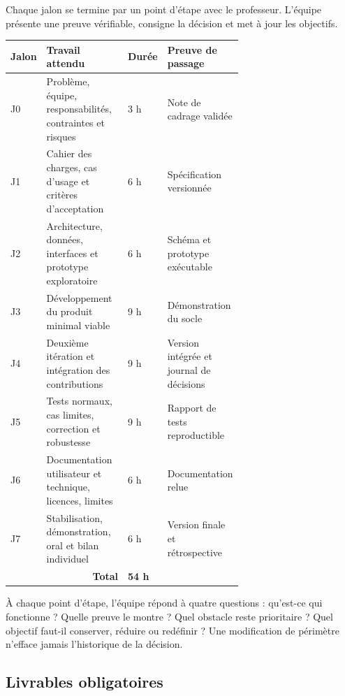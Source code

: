 Chaque jalon se termine par un point d'étape avec le professeur. L'équipe présente une
preuve vérifiable, consigne la décision et met à jour les objectifs.

\begin{center}
\begin{tabular}{|p{0.08\linewidth}|>{\raggedright\arraybackslash}p{0.46\linewidth}|p{0.12\linewidth}|>{\raggedright\arraybackslash}p{\dimexpr\linewidth-8\tabcolsep-5\arrayrulewidth-0.66\linewidth\relax}|}
\hline
\textbf{Jalon} & \textbf{Travail attendu} & \textbf{Durée} & \textbf{Preuve de passage} \\
\hline
J0 & Problème, équipe, responsabilités, contraintes et risques & 3 h & Note de cadrage validée \\
\hline
J1 & Cahier des charges, cas d'usage et critères d'acceptation & 6 h & Spécification versionnée \\
\hline
J2 & Architecture, données, interfaces et prototype exploratoire & 6 h & Schéma et prototype exécutable \\
\hline
J3 & Développement du produit minimal viable & 9 h & Démonstration du socle \\
\hline
J4 & Deuxième itération et intégration des contributions & 9 h & Version intégrée et journal de décisions \\
\hline
J5 & Tests normaux, cas limites, correction et robustesse & 9 h & Rapport de tests reproductible \\
\hline
J6 & Documentation utilisateur et technique, licences, limites & 6 h & Documentation relue \\
\hline
J7 & Stabilisation, démonstration, oral et bilan individuel & 6 h & Version finale et rétrospective \\
\hline
\multicolumn{2}{|r|}{\textbf{Total}} & \textbf{54 h} & \\
\hline
\end{tabular}
\end{center}

À chaque point d'étape, l'équipe répond à quatre questions : qu'est-ce qui fonctionne ?
Quelle preuve le montre ? Quel obstacle reste prioritaire ? Quel objectif faut-il conserver,
réduire ou redéfinir ? Une modification de périmètre n'efface jamais l'historique de la
décision.

\subsection*{Livrables obligatoires}

